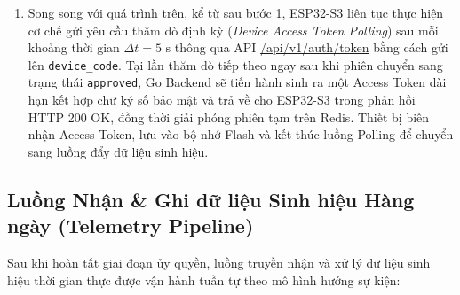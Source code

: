 \documentclass[a4paper,13pt,3p,oneside]{report}
\begin{document}
\begin{enumerate}
    \item Song song với quá trình trên, kể từ sau bước 1, ESP32-S3 liên tục thực hiện cơ chế gửi yêu cầu thăm dò định kỳ (\textit{Device Access Token Polling}) sau mỗi khoảng thời gian $\Delta t = 5\text{ s}$ thông qua API \url{/api/v1/auth/token} bằng cách gửi lên \texttt{device\_code}. Tại lần thăm dò tiếp theo ngay sau khi phiên chuyển sang trạng thái \texttt{approved}, Go Backend sẽ tiến hành sinh ra một Access Token dài hạn kết hợp chữ ký số bảo mật và trả về cho ESP32-S3 trong phản hồi HTTP 200 OK, đồng thời giải phóng phiên tạm trên Redis. Thiết bị biên nhận Access Token, lưu vào bộ nhớ Flash và kết thúc luồng Polling để chuyển sang luồng đẩy dữ liệu sinh hiệu.
\end{enumerate}

\subsection{Luồng Nhận \& Ghi dữ liệu Sinh hiệu Hàng ngày (Telemetry Pipeline)}
Sau khi hoàn tất giai đoạn ủy quyền, luồng truyền nhận và xử lý dữ liệu sinh hiệu thời gian thực được vận hành tuần tự theo mô hình hướng sự kiện:
\end{document}
